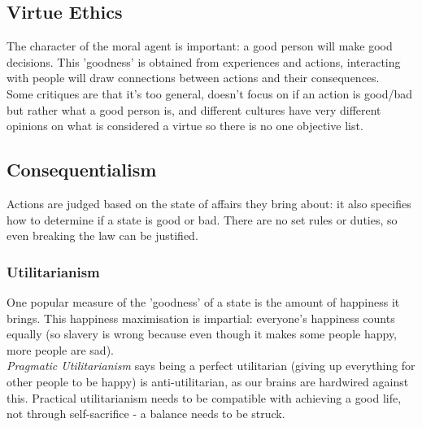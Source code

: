 \subsection{Virtue Ethics}
The character of the moral agent is important: a good person will make good decisions. This 'goodness' is obtained from experiences and actions, interacting with people will draw connections between actions and their consequences.\\
Some critiques are that it's too general, doesn't focus on if an action is good/bad but rather what a good person is, and different cultures have very different opinions on what is considered a virtue so there is no one objective list.

\subsection{Consequentialism}
Actions are judged based on the state of affairs they bring about: it also specifies how to determine if a state is good or bad. There are no set rules or duties, so even breaking the law can be justified. 

\subsubsection{Utilitarianism}
One popular measure of the 'goodness' of a state is the amount of happiness it brings. This happiness maximisation is impartial: everyone's happiness counts equally (so slavery is wrong because even though it makes some people happy, more people are sad). \\
\emph{Pragmatic Utilitarianism} says being a perfect utilitarian (giving up everything for other people to be happy) is anti-utilitarian, as our brains are hardwired against this. Practical utilitarianism needs to be compatible with achieving a good life, not through self-sacrifice - a balance needs to be struck.

